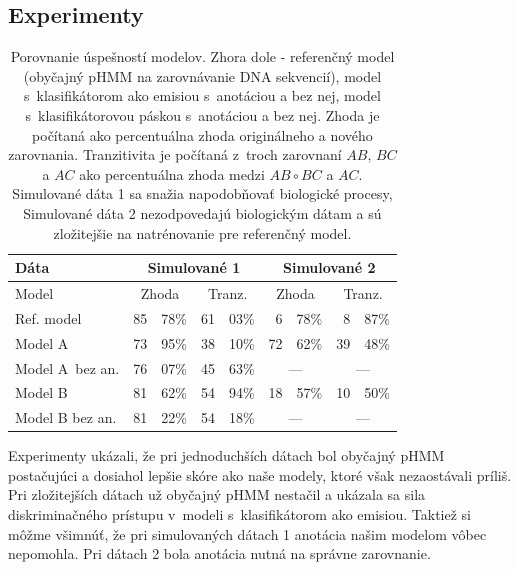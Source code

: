 \documentclass[myposter,portrait]{sciposter}
\def\mysection#1{
{\color{SectionCol}\section*{\sc\bfseries #1}}}
\begin{document}
\begin{multicols*}{3}
\mysection{Experimenty}

\begin{table}[htp]
\centering
\begin{tabular}{|l|r@{,}lr@{,}l|r@{,}lr@{,}l|}
\hline
Dáta &  \multicolumn{4}{|c|}{Simulované 1}  & \multicolumn{4}{|c|}{Simulované 2}\\%
\hline
Model & \multicolumn{2}{|c}{Zhoda} & \multicolumn{2}{c}{Tranz.} & \multicolumn{2}{|c}{Zhoda} & \multicolumn{2}{c|}{Tranz.}\\%
\hline
Ref. model & 85 & 78\% & 61 & 03\% & 6 & 78\% & 8 & 87\%\\%
\hline
Model A~& 73 & 95\% & 38 & 10\% & 72 & 62\% & 39 & 48\%\\%
\hline
Model A~bez an. & 76 & 07\% & 45 & 63\% &  \multicolumn{2}{|c}{---} & \multicolumn{2}{c|}{---} \\%
\hline
Model B & 81 & 62\% & 54 & 94\% & 18 & 57\% & 10 & 50\%\\%
\hline
Model B  bez an.& 81 & 22\% & 54 & 18\% & \multicolumn{2}{|c}{---} & \multicolumn{2}{c|}{---}\\%
\hline

\end{tabular}
\vspace{0.5cm}
\caption{Porovnanie úspešností modelov. Zhora dole - referenčný model (obyčajný pHMM na zarovnávanie DNA sekvencií), model s~klasifikátorom ako emisiou s~anotáciou a bez nej, model s~klasifikátorovou páskou s~anotáciou a bez nej. Zhoda je počítaná ako percentuálna zhoda originálneho a nového zarovnania. Tranzitivita je počítaná z~troch zarovnaní $AB$, $BC$ a $AC$ ako percentuálna zhoda medzi $AB \circ BC$ a $AC$. Simulované dáta 1 sa snažia napodobňovať biologické procesy, Simulované dáta 2 nezodpovedajú biologickým dátam a sú zložitejšie na natrénovanie pre referenčný model.}
\label{tab:datatype-all}
\end{table}

Experimenty ukázali, že pri jednoduchších dátach bol obyčajný pHMM postačujúci a dosiahol lepšie skóre ako naše modely, ktoré však nezaostávali príliš. Pri zložitejších dátach už obyčajný pHMM nestačil a ukázala sa sila diskriminačného prístupu v~modeli s~klasifikátorom ako emisiou. Taktiež si môžme všimnúť, že pri simulovaných dátach 1 anotácia našim modelom vôbec nepomohla. Pri dátach 2 bola anotácia nutná na správne zarovnanie.




\end{multicols*}
\end{document}
